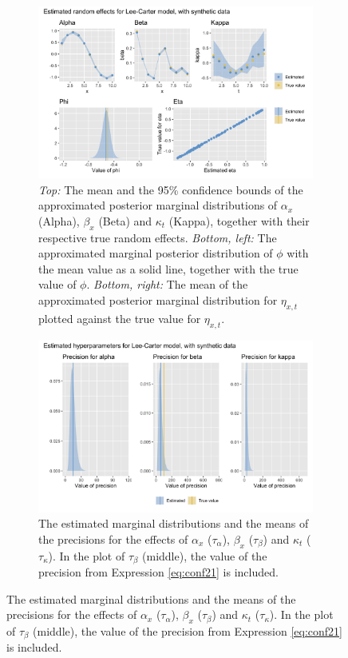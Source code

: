 \begin{figure}[h!]
    \centering
    \begin{subfigure}[b]{0.85\textwidth}
        \centering
        \includegraphics[width=\textwidth]{synthetic-data/Figures/effects-LC-synthetic.png}
        \caption{\textit{Top:} The mean and the 95\% confidence bounds of the approximated posterior marginal distributions of $\alpha_x$ (Alpha), $\beta_x$ (Beta) and $\kappa_t$ (Kappa), together with their respective true random effects. \textit{Bottom, left:} The approximated marginal posterior distribution of $\phi$ with the mean value as a solid line, together with the true value of $\phi$. \textit{Bottom, right:} The mean of the approximated posterior marginal distribution for $\eta_{x,t}$ plotted against the true value for $\eta_{x,t}$. }
        \label{fig:firstRun-top}
    \end{subfigure}
    
    \begin{subfigure}[b]{0.6\textwidth}
        \centering
        \includegraphics[width=\textwidth]{synthetic-data/Figures/hyperparameters-LC-synthetic-2-1.png}
        \caption{The estimated marginal distributions and the means of the precisions for the effects of $\alpha_x$ ($\tau_\alpha$), $\beta_x$ ($\tau_\beta$) and $\kappa_t$ ($\tau_\kappa$). In the plot of $\tau_\beta$ (middle), the value of the precision from Expression \ref{eq:conf21} is included. }
        \label{fig:firstRun-bottom}
    \end{subfigure}
    

\end{figure}
